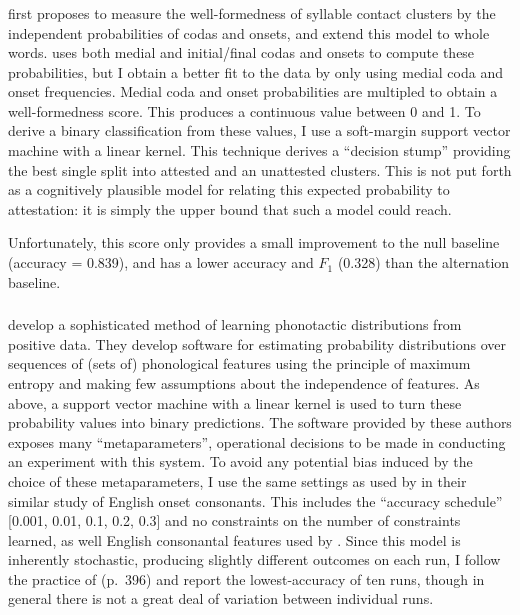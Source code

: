 \subsubsection{\citet{Pierrehumbert1994}}

\citet{Pierrehumbert1994} first proposes to measure the well-formedness of syllable contact clusters by the independent probabilities of codas and onsets, and \citet{Coleman1997} extend this model to whole words. \citet{Pierrehumbert1994} uses both medial and initial/final codas and onsets to compute these probabilities, but I obtain a better fit to the data by only using medial coda and onset frequencies. Medial coda and onset probabilities are multipled to obtain a well-formedness score. This produces a continuous value between 0 and 1. To derive a binary classification from these values, I use a soft-margin support vector machine \citep{Cortes1995} with a linear kernel. This technique derives a ``decision stump'' providing the best single split into attested and an unattested clusters. This is not put forth as a cognitively plausible model for relating this expected probability to attestation: it is simply the upper bound that such a model could reach. 

Unfortunately, this score only provides a small improvement to the null baseline
 (accuracy = 0.839), and has a lower accuracy and $F_1$ (0.328) than the alternation baseline. 

\subsubsection{\citet{Hayes2008a}}

\citeauthor{Hayes2008a} develop a sophisticated method of learning phonotactic distributions from positive data. They develop software for estimating probability distributions over sequences of (sets of) phonological features using the principle of maximum entropy and making few assumptions about the independence of features. As above, a support vector machine with a linear kernel is used to turn these probability values into binary predictions. The software provided by these authors exposes many ``metaparameters'', operational decisions to be made in conducting an experiment with this system. To avoid any potential bias induced by the choice of these metaparameters, I use the same settings as used by \citet{Hayes2008a} in their similar study of English onset consonants. This includes the ``accuracy schedule'' [0.001, 0.01, 0.1, 0.2, 0.3] and no constraints on the number of constraints learned, as well English consonantal features used by \citeauthor{Hayes2008a}. Since this model is inherently stochastic, producing slightly different outcomes on each run, I follow the practice of \citeauthor{Hayes2008a} (p.~396) and report the lowest-accuracy of ten runs, though in general there is not a great deal of variation between individual runs.  

